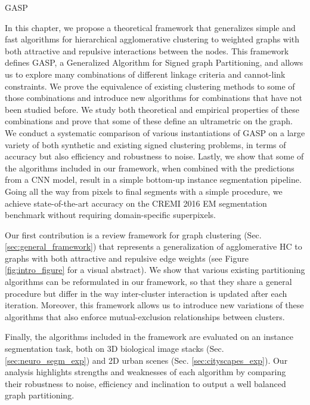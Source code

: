GASP

In this chapter, we propose a theoretical framework that generalizes simple and fast algorithms for hierarchical agglomerative clustering to weighted graphs with both attractive and repulsive interactions between the nodes. This framework defines GASP, a Generalized Algorithm for Signed graph Partitioning, and allows us to explore many combinations of different linkage criteria and cannot-link constraints. 
We prove the equivalence of existing clustering methods to some of those combinations and introduce new algorithms for combinations that have not been studied before. 
We study both theoretical and empirical properties of these combinations and prove that some of these define an ultrametric on the graph.
We conduct a systematic comparison of various instantiations of GASP on a large variety of both synthetic and existing signed clustering problems, in terms of accuracy but also efficiency and robustness to noise. 
Lastly, we show that some of the algorithms included in our framework, when combined with the predictions from a CNN model, result in a simple bottom-up instance segmentation pipeline.
Going all the way from pixels to final segments with a simple procedure, we achieve state-of-the-art accuracy on the CREMI 2016 EM segmentation benchmark without requiring domain-specific superpixels.





Our first contribution is a review framework for graph clustering (Sec. \ref{sec:general_framework}) that represents a generalization of agglomerative HC to graphs with both attractive and repulsive edge weights (see Figure \ref{fig:intro_figure} for a visual abstract). 
We show that various existing partitioning algorithms \cite{levinkov2017comparative,wolf2018mutex,kardoostsolving,lance1967general} can be reformulated in our framework, so that they share a general procedure but differ in the way inter-cluster interaction is updated after each iteration. Moreover, this framework allows us to introduce new variations of these algorithms that also enforce mutual-exclusion relationships between clusters.  

Finally, the algorithms included in the framework are evaluated on an instance segmentation task, both on 3D biological image stacks (Sec. \ref{sec:neuro_segm_exp}) and 2D urban scenes (Sec. \ref{sec:cityscapes_exp}). Our analysis highlights strengths and weaknesses of each algorithm by comparing their robustness to noise, efficiency and inclination to output a well balanced graph partitioning.




